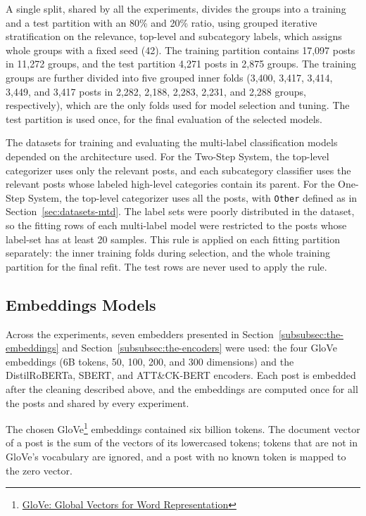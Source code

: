 A single split, shared by all the experiments, divides the groups into a training and a test partition with an 80{\%} and 20{\%} ratio, using grouped iterative stratification on the relevance, top-level and subcategory labels, which assigns whole groups with a fixed seed (42). The training partition contains 17,097 posts in 11,272 groups, and the test partition 4,271 posts in 2,875 groups. The training groups are further divided into five grouped inner folds (3,400, 3,417, 3,414, 3,449, and 3,417 posts in 2,282, 2,188, 2,283, 2,231, and 2,288 groups, respectively), which are the only folds used for model selection and tuning. The test partition is used once, for the final evaluation of the selected models.

The datasets for training and evaluating the multi-label classification models depended on the architecture used. For the Two-Step System, the top-level categorizer uses only the relevant posts, and each subcategory classifier uses the relevant posts whose labeled high-level categories contain its parent. For the One-Step System, the top-level categorizer uses all the posts, with \texttt{Other} defined as in Section~\ref{sec:datasets-mtd}. The label sets were poorly distributed in the dataset, so the fitting rows of each multi-label model were restricted to the posts whose label-set has at least 20 samples. This rule is applied on each fitting partition separately: the inner training folds during selection, and the whole training partition for the final refit. The test rows are never used to apply the rule.

\subsection{Embeddings Models}\label{subsec:embeddings-models}
Across the experiments, seven embedders presented in Section~\ref{subsubsec:the-embeddings} and Section~\ref{subsubsec:the-encoders} were used: the four GloVe embeddings (6B tokens, 50, 100, 200, and 300 dimensions) and the DistilRoBERTa, SBERT, and ATT{\&}CK-BERT encoders. Each post is embedded after the cleaning described above, and the embeddings are computed once for all the posts and shared by every experiment.

The chosen GloVe{\footnote{\href{https://nlp.stanford.edu/projects/glove/}{GloVe: Global Vectors for Word Representation}}} embeddings contained six billion tokens. The document vector of a post is the sum of the vectors of its lowercased tokens; tokens that are not in GloVe's vocabulary are ignored, and a post with no known token is mapped to the zero vector.

